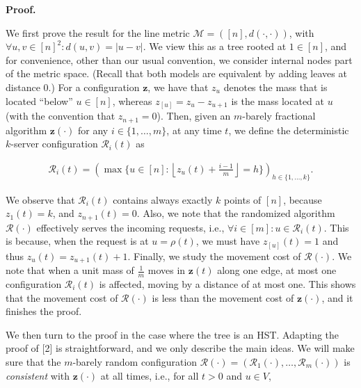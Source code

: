 \documentclass[10pt,a4paper]{article}
\begin{document}




\par\medskip\noindent\textbf{Proof.}\par




We first prove the result for the line metric $\mathcal{M}=([n],d(\cdot,\cdot))$, with $\forall u,v\in[n]^{2}\colon d(u,v)=|u-v|$.
We view this as a tree rooted at $1\in[n]$, and for convenience, other than our usual convention, we consider internal nodes part of the metric space. (Recall that both models are equivalent by adding leaves at distance $0$.)
For a configuration ${\mathbf{z}}$, we have that $z_{u}$ denotes the mass that is located “below” $u\in[n]$, whereas $z_{[u]}=z_{u}-z_{u+1}$ is the mass located at $u$ (with the convention that $z_{n+1}=0$). Then, given an $m$-barely fractional algorithm ${\mathbf{z}}(\cdot)$ for any $i\in\{1,\dots,m\}$, at any time $t$, we define the deterministic $k$-server configuration $\mathcal{R}_{i}(t)$ as\par


\[\begin{gathered}
\mathcal{R}_{i}(t)=\left(\max\{u\in[n]\colon\left\lfloor z_{u}(t)+\frac{i-1}{m}\right\rfloor=h\}\right)_{h\in\{1,\dots,k\}}.
\end{gathered}\]


We observe that $\mathcal{R}_{i}(t)$ contains always exactly $k$ points of $[n]$, because $z_{1}(t)=k$, and $z_{n+1}(t)=0$. Also, we note that the randomized algorithm $\mathcal{R}(\cdot)$ effectively serves the incoming requests, i.e., $\forall i\in[m]\colon u\in\mathcal{R}_{i}(t)$. This is because, when the request is at $u=\rho(t)$, we must have $z_{[u]}(t)=1$ and thus $z_{u}(t)=z_{u+1}(t)+1$. Finally, we study the movement cost of $\mathcal{R}(\cdot)$. We note that when a unit mass of $\frac{1}{m}$ moves in ${\mathbf{z}}(t)$ along one edge, at most one configuration $\mathcal{R}_{i}(t)$ is affected, moving by a distance of at most one. This shows that the movement cost of $\mathcal{R}(\cdot)$ is less than the movement cost of ${\mathbf{z}}(\cdot)$, and it finishes the proof.\par




We then turn to the proof in the case where the tree is an HST. Adapting the proof of [2] is straightforward, and we only describe the main ideas. We will make sure that the $m$-barely random configuration $\mathcal{R}(\cdot)=(\mathcal{R}_{1}(\cdot),\dots,\mathcal{R}_{m}(\cdot))$ is \emph{consistent} with ${\mathbf{z}}(\cdot)$ at all times, i.e., for all $t>0$ and $u\in V$,\par
\end{document}

